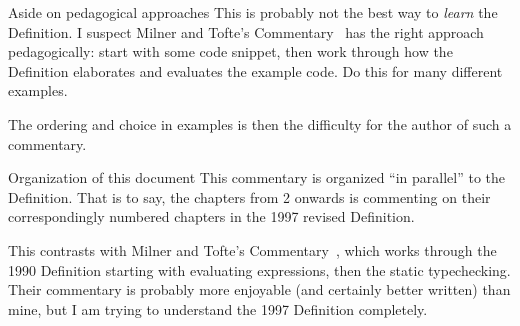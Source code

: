 \begin{remark}{Aside on pedagogical approaches}
This is probably not the best way to \emph{learn} the Definition. I
suspect Milner and Tofte's Commentary~\cite{milner1991commentary} has
the right approach pedagogically: start with some code snippet, then
work through how the Definition elaborates and evaluates the example code.
Do this for many different examples.

The ordering and choice in examples is then the difficulty for the
author of such a commentary.
\end{remark}

\begin{remark}{Organization of this document}
This commentary is organized ``in parallel'' to the Definition. That is
to say, the chapters from 2 onwards is commenting on their
correspondingly numbered chapters in the 1997 revised Definition.

This contrasts with Milner and Tofte's Commentary~\cite{milner1991commentary}, which works through
the 1990 Definition starting with evaluating expressions, then the static
typechecking. Their commentary is probably more enjoyable (and certainly
better written) than mine, but I am trying to understand the 1997
Definition completely.
\end{remark}

